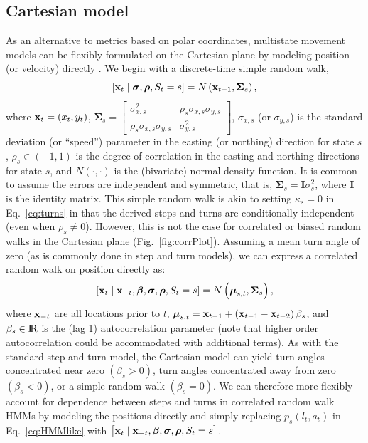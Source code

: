 \documentclass[12pt]{article}\usepackage[]{graphicx}\usepackage[]{xcolor}
\begin{document}
\subsection{Cartesian model}
As an alternative to metrics based on polar coordinates, multistate movement models can be flexibly formulated on the Cartesian plane by modeling position (or velocity) directly \citep[e.g.][]{blackwell1997random,JonsenEtAl2005,WhoriskeyEtAl2017,HootenEtAl2019,MichelotBlackwell2018}. We begin with a discrete-time simple random walk, 
\begin{equation}
\label{eq:srw}
  [{\bf x}_t \mid {\boldsymbol \sigma}, {\boldsymbol \rho}, S_t=s] = N\left({\bf x}_{t-1},{\boldsymbol \Sigma}_s\right),
\end{equation}
where ${\bf x}_t=\left(x_t,y_t\right)$, $
{\boldsymbol \Sigma}_s = \begin{bmatrix}
  \sigma^2_{x,s} & \rho_s \sigma_{x,s} \sigma_{y,s} \\
  \rho_s \sigma_{x,s} \sigma_{y,s} &  \sigma^2_{y,s} 
\end{bmatrix}$, $\sigma_{x,s}$ (or $\sigma_{y,s}$) is the standard deviation (or ``speed'') parameter in the easting (or northing) direction for state $s$, $\rho_s \in (-1,1)$ is the degree of correlation in the easting and northing directions for state $s$, and $N(\cdot,\cdot)$ is the (bivariate) normal density function. It is common to assume the errors are independent and symmetric, that is, ${\boldsymbol \Sigma}_s=\mathbf{I}\sigma^2_s$, where $\mathbf{I}$ is the identity matrix. This simple random walk is akin to setting $\kappa_s=0$ in Eq.\ \ref{eq:turns} in that the derived steps and turns are conditionally independent (even when $\rho_s \ne 0$). However, this is not the case for correlated or biased random walks in the Cartesian plane (Fig.\ \ref{fig:corrPlot}). Assuming a mean turn angle of zero (as is commonly done in step and turn models), we can express a correlated random walk on position directly as:
\begin{equation}
\label{eq:crw}
  [{\bf x}_t \mid {\bf x}_{-t}, \boldsymbol{\beta}, {\boldsymbol \sigma}, {\boldsymbol \rho}, S_t=s] = N\left(\boldsymbol{\mu}_{s,t},{\boldsymbol \Sigma}_s\right),
\end{equation}
where ${\bf x}_{-t}$ are all locations prior to $t$, $\boldsymbol{\mu}_{s,t}={\bf x}_{t-1}+\left({\bf x}_{t-1}-{\bf x}_{t-2}\right) \beta_s$, and $\beta_s \in {\rm I\!R}
$ is the (lag 1) autocorrelation parameter (note that higher order autocorrelation could be accommodated with additional terms). As with the standard step and turn model, the Cartesian model can yield turn angles concentrated near zero $\left(\beta_s>0\right)$, turn angles concentrated away from zero $\left(\beta_s <0 \right)$, or a simple random walk $\left(\beta_s=0\right)$. We can therefore more flexibly account for dependence between steps and turns in correlated random walk HMMs by modeling the positions directly and simply replacing $p_s(l_t,a_t)$ in Eq.\ \ref{eq:HMMlike} with $\left[{\bf x}_t \mid {\bf x}_{-t}, \boldsymbol{\beta}, {\boldsymbol \sigma}, {\boldsymbol \rho}, S_t=s\right]$.
\end{document}
